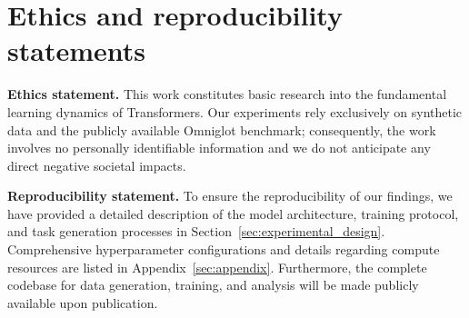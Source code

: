 \section*{Ethics and reproducibility statements}

\textbf{Ethics statement.}
This work constitutes basic research into the fundamental learning dynamics of Transformers. Our experiments rely exclusively on synthetic data and the publicly available Omniglot benchmark; consequently, the work involves no personally identifiable information and we do not anticipate any direct negative societal impacts.

\textbf{Reproducibility statement.}
To ensure the reproducibility of our findings, we have provided a detailed description of the model architecture, training protocol, and task generation processes in Section~\ref{sec:experimental_design}. Comprehensive hyperparameter configurations and details regarding compute resources are listed in Appendix~\ref{sec:appendix}. Furthermore, the complete codebase for data generation, training, and analysis will be made publicly available upon publication.
